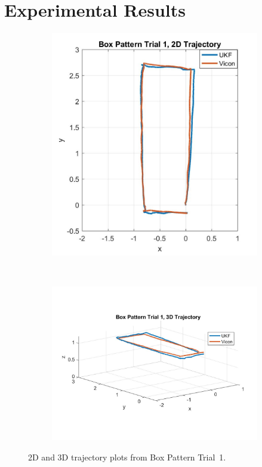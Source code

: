 \chapter{Experimental Results}

\begin{figure}
    \centering
    \begin{subfigure}{0.4\textwidth}
        \includegraphics[width=\textwidth,left]{box1_2d}
    \end{subfigure}%
    ~ 
    \begin{subfigure}{0.6\textwidth}
        \centering
        \includegraphics[width=\textwidth,right]{box1_3d}
    \end{subfigure}
    \caption[Box Pattern Trial 1 Trajectory]{2D and 3D trajectory plots from Box Pattern Trial~1.}
    \label{fig:box1_traj}
\end{figure}

